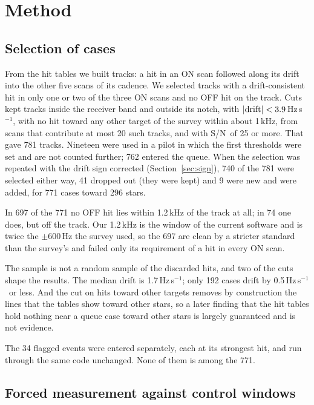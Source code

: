 \documentclass[twocolumn]{aastex631}
\newcommand{\hzs}{Hz\,s$^{-1}$}
\newcommand{\sn}{S/N}
\begin{document}
\section{Method} \label{sec:method}

\subsection{Selection of cases} \label{sec:selection}

From the hit tables we built tracks: a hit in an ON scan followed along its
drift into the other five scans of its cadence. We selected tracks with a
drift-consistent hit in only one or two of the three ON scans and no OFF hit
on the track. Cuts kept tracks inside the receiver band and outside its
notch, with $|{\rm drift}|<3.9$\,\hzs, with no hit toward any other target
of the survey within about 1\,kHz, from scans that contribute at most 20
such tracks, and with \sn\ of 25 or more. That gave 781 tracks. Nineteen
were used in a pilot in which the first thresholds were set and are not
counted further; 762 entered the queue. When the selection was repeated with
the drift sign corrected (Section~\ref{sec:sign}), 740 of the 781 were
selected either way, 41 dropped out (they were kept) and 9 were new and
were added, for 771 cases toward 296 stars.

In 697 of the 771 no OFF hit lies within 1.2\,kHz of the track at all; in 74
one does, but off the track. Our 1.2\,kHz is the window of the current
software and is twice the $\pm600$\,Hz the survey used, so the 697 are clean
by a stricter standard than the survey's and failed only its requirement of
a hit in every ON scan.

The sample is not a random sample of the discarded hits, and two of the
cuts shape the results. The median drift is 1.7\,\hzs; only 192 cases drift
by 0.5\,\hzs\ or less. And the cut on hits toward other targets removes by
construction the lines that the tables show toward other stars, so a later
finding that the hit tables hold nothing near a queue case toward other
stars is largely guaranteed and is not evidence.

The 34 flagged events were entered separately, each at its strongest hit,
and run through the same code unchanged. None of them is among the 771.

\subsection{Forced measurement against control windows}
\end{document}
